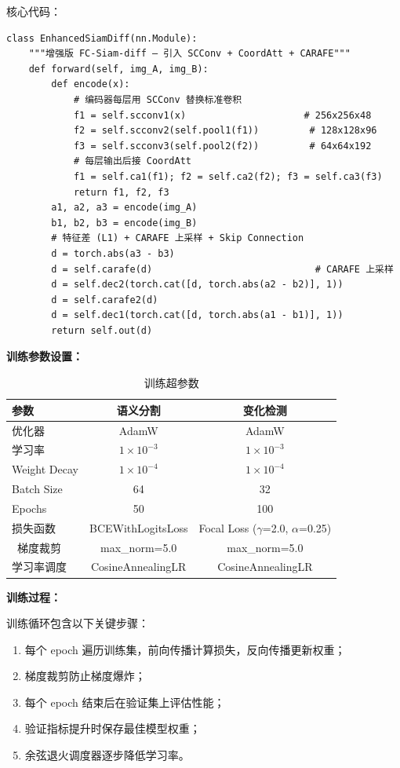 \documentclass[12pt,a4paper]{article}
\begin{document}
核心代码：

\begin{lstlisting}
class EnhancedSiamDiff(nn.Module):
    """增强版 FC-Siam-diff — 引入 SCConv + CoordAtt + CARAFE"""
    def forward(self, img_A, img_B):
        def encode(x):
            # 编码器每层用 SCConv 替换标准卷积
            f1 = self.scconv1(x)                     # 256x256x48
            f2 = self.scconv2(self.pool1(f1))         # 128x128x96
            f3 = self.scconv3(self.pool2(f2))         # 64x64x192
            # 每层输出后接 CoordAtt
            f1 = self.ca1(f1); f2 = self.ca2(f2); f3 = self.ca3(f3)
            return f1, f2, f3
        a1, a2, a3 = encode(img_A)
        b1, b2, b3 = encode(img_B)
        # 特征差 (L1) + CARAFE 上采样 + Skip Connection
        d = torch.abs(a3 - b3)
        d = self.carafe(d)                             # CARAFE 上采样
        d = self.dec2(torch.cat([d, torch.abs(a2 - b2)], 1))
        d = self.carafe2(d)
        d = self.dec1(torch.cat([d, torch.abs(a1 - b1)], 1))
        return self.out(d)
\end{lstlisting}

\textbf{训练参数设置：}

\begin{table}[H]
\centering
\caption{训练超参数}
\label{tab:hp}
\begin{tabular}{lcc}
\toprule
参数 & 语义分割 & 变化检测 \\
\midrule
优化器 & AdamW & AdamW \\
学习率 & $1\times10^{-3}$ & $1\times10^{-3}$ \\
Weight Decay & $1\times10^{-4}$ & $1\times10^{-4}$ \\
Batch Size & 64 & 32 \\
Epochs & 50 & 100 \\
损失函数 & BCEWithLogitsLoss & Focal Loss ($\gamma$=2.0, $\alpha$=0.25) \\\
梯度裁剪 & max\_norm=5.0 & max\_norm=5.0 \\
学习率调度 & CosineAnnealingLR & CosineAnnealingLR \\
\bottomrule
\end{tabular}
\end{table}

\textbf{训练过程：}

训练循环包含以下关键步骤：

\begin{enumerate}
    \item 每个 epoch 遍历训练集，前向传播计算损失，反向传播更新权重；
    \item 梯度裁剪防止梯度爆炸；
    \item 每个 epoch 结束后在验证集上评估性能；
    \item 验证指标提升时保存最佳模型权重；
    \item 余弦退火调度器逐步降低学习率。
\end{enumerate}
\end{document}
